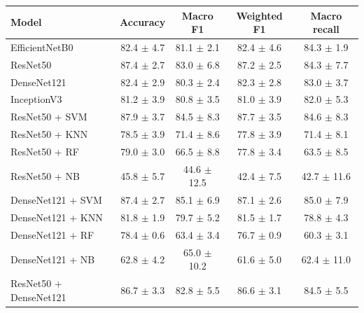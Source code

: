 \begin{tabular}{lcccc}
\toprule
Model & Accuracy & Macro F1 & Weighted F1 & Macro recall \\
\midrule
EfficientNetB0 & 82.4 $\pm$ 4.7 & 81.1 $\pm$ 2.1 & 82.4 $\pm$ 4.6 & 84.3 $\pm$ 1.9 \\
ResNet50 & 87.4 $\pm$ 2.7 & 83.0 $\pm$ 6.8 & 87.2 $\pm$ 2.5 & 84.3 $\pm$ 7.7 \\
DenseNet121 & 82.4 $\pm$ 2.9 & 80.3 $\pm$ 2.4 & 82.3 $\pm$ 2.8 & 83.0 $\pm$ 3.7 \\
InceptionV3 & 81.2 $\pm$ 3.9 & 80.8 $\pm$ 3.5 & 81.0 $\pm$ 3.9 & 82.0 $\pm$ 5.3 \\
ResNet50 + SVM & 87.9 $\pm$ 3.7 & 84.5 $\pm$ 8.3 & 87.7 $\pm$ 3.5 & 84.6 $\pm$ 8.3 \\
ResNet50 + KNN & 78.5 $\pm$ 3.9 & 71.4 $\pm$ 8.6 & 77.8 $\pm$ 3.9 & 71.4 $\pm$ 8.1 \\
ResNet50 + RF & 79.0 $\pm$ 3.0 & 66.5 $\pm$ 8.8 & 77.8 $\pm$ 3.4 & 63.5 $\pm$ 8.5 \\
ResNet50 + NB & 45.8 $\pm$ 5.7 & 44.6 $\pm$ 12.5 & 42.4 $\pm$ 7.5 & 42.7 $\pm$ 11.6 \\
DenseNet121 + SVM & 87.4 $\pm$ 2.7 & 85.1 $\pm$ 6.9 & 87.1 $\pm$ 2.6 & 85.0 $\pm$ 7.9 \\
DenseNet121 + KNN & 81.8 $\pm$ 1.9 & 79.7 $\pm$ 5.2 & 81.5 $\pm$ 1.7 & 78.8 $\pm$ 4.3 \\
DenseNet121 + RF & 78.4 $\pm$ 0.6 & 63.4 $\pm$ 3.4 & 76.7 $\pm$ 0.9 & 60.3 $\pm$ 3.1 \\
DenseNet121 + NB & 62.8 $\pm$ 4.2 & 65.0 $\pm$ 10.2 & 61.6 $\pm$ 5.0 & 62.4 $\pm$ 11.0 \\
ResNet50 + DenseNet121 & 86.7 $\pm$ 3.3 & 82.8 $\pm$ 5.5 & 86.6 $\pm$ 3.1 & 84.5 $\pm$ 5.5 \\
\bottomrule
\end{tabular}
